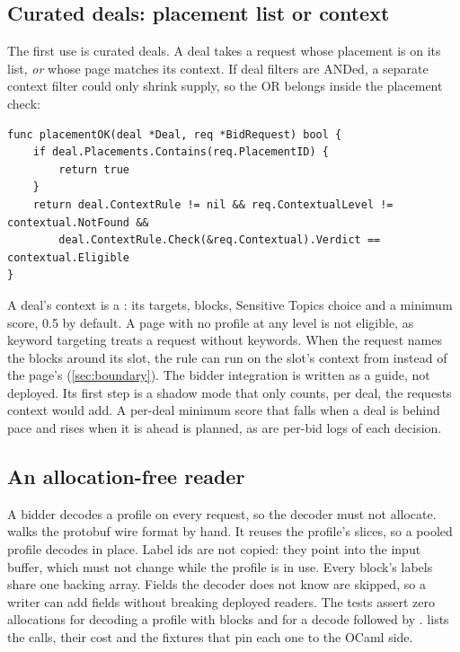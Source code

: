 \subsection{Curated deals: placement list or context}\label{sec:serving-deals}

The first use is curated deals. A deal takes a request whose placement is on
its list, \emph{or} whose page matches its context. If deal filters are ANDed,
a separate context filter could only shrink supply, so the OR belongs inside
the placement check:
\begin{lstlisting}
func placementOK(deal *Deal, req *BidRequest) bool {
    if deal.Placements.Contains(req.PlacementID) {
        return true
    }
    return deal.ContextRule != nil && req.ContextualLevel != contextual.NotFound &&
        deal.ContextRule.Check(&req.Contextual).Verdict == contextual.Eligible
}
\end{lstlisting}
A deal's context is a : its targets, blocks, Sensitive Topics choice
and a minimum score, 0.5 by default. A page with no profile at any level is not
eligible, as keyword targeting treats a request without keywords. When the
request names the blocks around its slot, the rule can run on the slot's
context from  instead of the page's
(\cref{sec:boundary}). The bidder integration is written as a guide, not
deployed. Its first step is a shadow mode that only counts, per deal, the
requests context would add. A per-deal minimum score that falls when a deal is
behind pace and rises when it is ahead is planned, as are per-bid logs of each
decision.

\subsection{An allocation-free reader}\label{sec:serving-reader}

A bidder decodes a profile on every request, so the decoder must not allocate.
 walks the protobuf wire format by hand. It reuses the
profile's slices, so a pooled profile decodes in place. Label ids are not
copied: they point into the input buffer, which must not change while the
profile is in use. Every block's labels share one backing array. Fields the
decoder does not know are skipped, so a writer can add fields without breaking
deployed readers. The tests assert zero allocations for decoding a profile
with blocks and for a decode followed by .
 lists the calls, their cost and the fixtures that pin
each one to the OCaml side.

